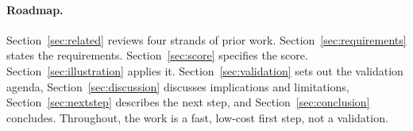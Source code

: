 \paragraph{Roadmap.}
Section~\ref{sec:related} reviews four strands of prior work. Section~\ref{sec:requirements} states the requirements. Section~\ref{sec:score} specifies the score. Section~\ref{sec:illustration} applies it. Section~\ref{sec:validation} sets out the validation agenda, Section~\ref{sec:discussion} discusses implications and limitations, Section~\ref{sec:nextstep} describes the next step, and Section~\ref{sec:conclusion} concludes. Throughout, the work is a fast, low-cost first step, not a validation.
